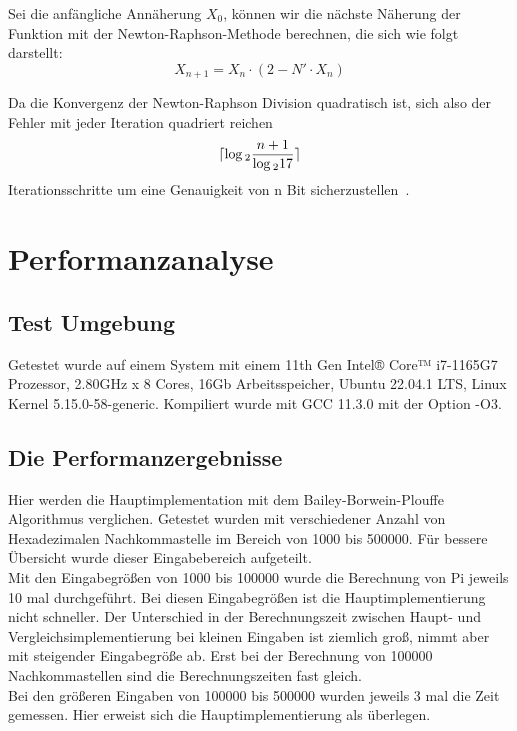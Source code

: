 \documentclass[course=erap]{aspdoc}
\begin{document}
Sei die anfängliche Annäherung $X_0$, können wir die nächste Näherung der Funktion mit der Newton-Raphson-Methode berechnen, 
die sich wie folgt darstellt:
\begin{equation*}
    X_{n+1} = X_n \cdot (2 - N' \cdot X_n)
\end{equation*}

Da die Konvergenz der Newton-Raphson Division quadratisch ist, sich also der Fehler mit jeder Iteration quadriert reichen
\begin{equation*}
    \lceil\log\textsubscript{2}\frac{n + 1}{\log\textsubscript{2}17}\rceil
\end{equation*}
Iterationsschritte um eine Genauigkeit von n Bit sicherzustellen~\cite{Vestias2013}.


\section{Performanzanalyse}

\subsection{Test Umgebung}
Getestet wurde auf einem System mit einem 11th Gen Intel® Core™ i7-1165G7 Prozessor, 2.80GHz x 8 Cores, 16Gb Arbeitsspeicher,
Ubuntu 22.04.1 LTS, Linux Kernel 5.15.0-58-generic. Kompiliert wurde mit GCC 11.3.0 mit der Option -O3.

\subsection{Die Performanzergebnisse}
Hier werden die Hauptimplementation mit dem Bailey-Borwein-Plouffe Algorithmus verglichen. Getestet wurden mit verschiedener Anzahl von Hexadezimalen Nachkommastelle im Bereich von 1000 bis 500000. Für bessere Übersicht wurde dieser Eingabebereich aufgeteilt. \\
Mit den Eingabegrößen von 1000 bis 100000 wurde die Berechnung von Pi jeweils 10 mal durchgeführt. 
Bei diesen Eingabegrößen ist die Hauptimplementierung nicht schneller. Der Unterschied in der Berechnungszeit zwischen Haupt- und Vergleichsimplementierung bei kleinen 
Eingaben ist ziemlich groß, nimmt aber mit steigender Eingabegröße ab. Erst bei der Berechnung von 100000 Nachkommastellen
sind die Berechnungszeiten fast gleich. \\
Bei den größeren Eingaben von 100000 bis 
500000 wurden jeweils 3 mal die Zeit gemessen. Hier erweist sich die Hauptimplementierung als überlegen. 
\end{document}
